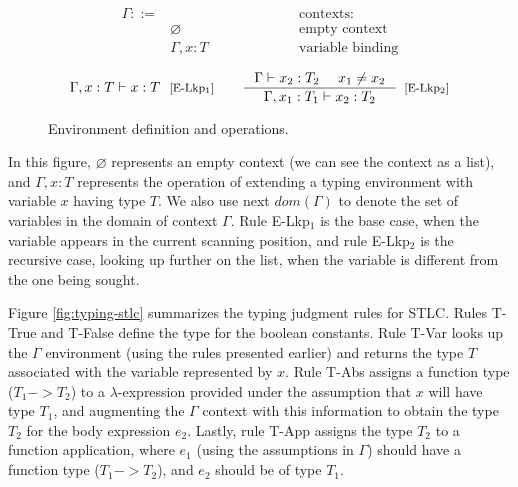 \documentclass[tese,capa,english]{texufpel}
\begin{document}
\begin{figure}[!htb]
\[
\begin{array}{llr}
  \Gamma ::= & \ \ \ \ \ \ \ \ \ \ \ \ \ \ \ \ \ \ \ \ \ \ \ \ \ \ \ \ \ \ \ \ \ \ \ \ \ \ & \textrm{contexts:} \\
        & \varnothing & \textrm{empty context} \\
        & \Gamma , x : T & \textrm{variable binding} \\           
\end{array}
\]
\[
\begin{array}{ccc}
    \Gamma , x : T \vdash x : T \ \ \footnotesize\textrm{[E-Lkp$_1$]}
  & &
    \inference{\Gamma \vdash x_2 : T_2 \ \ \ \ x_1 \neq x_2}
              {\Gamma , x_1 : T_1 \vdash x_2 : T_2}[\textrm{[E-Lkp$_2$]}]
\end{array}    
\]
\caption{Environment definition and operations.}
\label{fig:look-stlc}
\end{figure}

In this figure, $\varnothing$ represents an empty context (we can see the context as a list), and $\Gamma , x : T$ represents the operation of extending a typing environment with variable $x$ having type $T$. We also use next $dom(\Gamma)$ to denote the set of variables in the domain of context $\Gamma$. Rule {\footnotesize E-Lkp$_1$} is the base case, when the variable appears in the current scanning position, and rule {\footnotesize E-Lkp$_2$} is the recursive case, looking up further on the list, when the variable is different from the one being sought.

Figure \ref{fig:typing-stlc} summarizes the typing judgment rules for STLC. Rules {\footnotesize T-True} and {\footnotesize T-False} define the type for the boolean constants. Rule {\footnotesize T-Var} looks up the $\Gamma$ environment (using the rules presented earlier) and returns the type $T$ associated with the variable represented by $x$. Rule {\footnotesize T-Abs} assigns a function type ($T_1 -> T_2$) to a $\lambda$-expression provided under the assumption that $x$ will have type $T_1$, and augmenting the $\Gamma$ context with this information to obtain the type $T_2$ for the body expression $e_2$. Lastly, rule {\footnotesize T-App} assigns the type $T_2$ to a function application, where $e_1$ (using the assumptions in $\Gamma$) should have a function type ($T_1 -> T_2$), and $e_2$ should be of type $T_1$.
\end{document}

